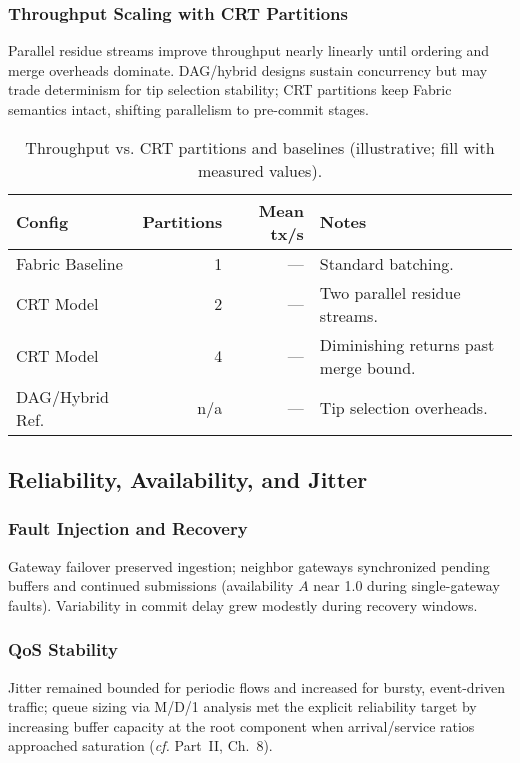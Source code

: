 \subsubsection{Throughput Scaling with CRT Partitions}
Parallel residue streams improve throughput nearly linearly until ordering and merge overheads dominate. DAG/hybrid designs sustain concurrency but may trade determinism for tip selection stability; CRT partitions keep Fabric semantics intact, shifting parallelism to pre-commit stages.
\begin{table}[!t]
  \centering
  \caption{Throughput vs. CRT partitions and baselines (illustrative; fill with measured values).}
  \label{tab:throughput-crt}
  \begin{tabular}{lrrl}
    \toprule
    Config & Partitions & Mean tx/s & Notes \\
    \midrule
    Fabric Baseline & 1 & --- & Standard batching. \\
    CRT Model & 2 & --- & Two parallel residue streams. \\
    CRT Model & 4 & --- & Diminishing returns past merge bound. \\
    DAG/Hybrid Ref. & n/a & --- & Tip selection overheads. \\
    \bottomrule
  \end{tabular}
\end{table}

\subsection{Reliability, Availability, and Jitter}

\subsubsection{Fault Injection and Recovery}
Gateway failover preserved ingestion; neighbor gateways synchronized pending buffers and continued submissions (availability $A$ near 1.0 during single-gateway faults). Variability in commit delay grew modestly during recovery windows. %

\subsubsection{QoS Stability}
Jitter remained bounded for periodic flows and increased for bursty, event-driven traffic; queue sizing via M/D/1 analysis met the explicit reliability target by increasing buffer capacity at the root component when arrival/service ratios approached saturation (\emph{cf.} Part~II, Ch.~8). %

